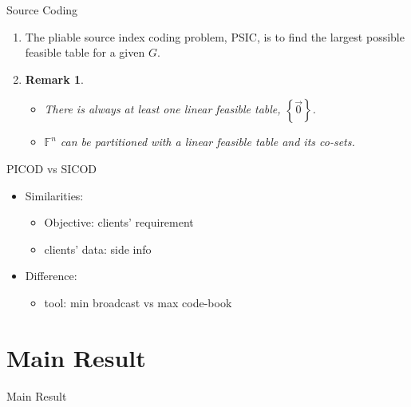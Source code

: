 \documentclass[xcolor=dvipsnames, aspectratio=169]{beamer}
\newtheorem{remark}[theorem]{Remark}
\newcommand{\set}[1]{\left\{ #1 \right\}}
\begin{document}
\begin{frame}{Source Coding }
	\begin{enumerate}[]
		\item<1->[]
		\begin{definition}
			The pliable source index coding problem, PSIC, is to find the largest possible feasible table for a given $G$.
		\end{definition}
		\item<2->[]
		\begin{remark}
			\begin{itemize}[label=\Roman*.]
				\item<2->[] There is always at least one linear feasible table, $\set{\overrightarrow{0}}$.
				\item<3->[] $\mathbb{F}^n$ can be partitioned with a linear feasible table and its co-sets.
			\end{itemize}
		\end{remark}
	\end{enumerate}
\end{frame}
\begin{frame}{PICOD vs SICOD}
	\begin{itemize}
	\item<1->[]	Similarities: 
	\begin{itemize}
		\item <2->[]
				Objective: clients' requirement
		\item<3->[]
		clients' data: side info
	\end{itemize}
	\item<4->[]	Difference: 
	\begin{itemize}
		\item <5->[]
		tool: min broadcast vs max code-book
	\end{itemize}
\end{itemize}
\end{frame}

\section{Main Result}
\begin{frame}
	\centering
	\Huge
	Main Result
\end{frame}
\end{document}
